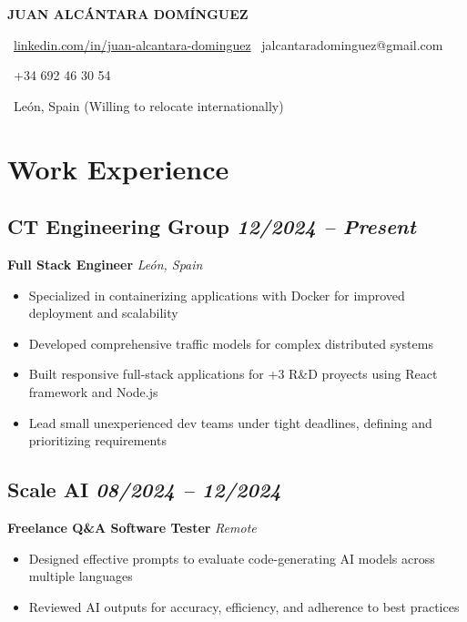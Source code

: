 \documentclass[11pt,a4paper]{article}
\begin{document}
\begin{center}
    {\Huge\bfseries\color{primarycolor} JUAN ALCÁNTARA DOMÍNGUEZ}
    \vspace{0.5em}
    
    \faLinkedin\ \href{https://www.linkedin.com/in/juan-alcantara-dominguez}{linkedin.com/in/juan-alcantara-dominguez} \quad
    \faEnvelope\ jalcantaradominguez@gmail.com

    \faPhone\ +34 692 46 30 54
    
    \faMapMarker\ León, Spain (Willing to relocate internationally)
\end{center}

\vspace{0em}

\section{Work Experience}

\subsection{CT Engineering Group \hfill \textit{12/2024 -- Present}}
\textbf{Full Stack Engineer} \hfill \textit{León, Spain}
\begin{itemize}
    \item Specialized in containerizing applications with Docker for improved deployment and scalability
    \item Developed comprehensive traffic models for complex distributed systems
    \item Built responsive full-stack applications for +3 R\&D proyects using React framework and Node.js
    \item Lead small unexperienced dev teams under tight deadlines, defining and prioritizing requirements
\end{itemize}

\subsection{Scale AI \hfill \textit{08/2024 -- 12/2024}}  
\textbf{Freelance Q\&A Software Tester} \hfill \textit{Remote}  
\begin{itemize}
    \item Designed effective prompts to evaluate code-generating AI models across multiple languages
    \item Reviewed AI outputs for accuracy, efficiency, and adherence to best practices
\end{itemize}
\end{document}
